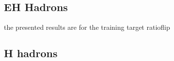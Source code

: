 \subsection{EH Hadrons}
the presented results are for the training target ratioflip





\subsection{H hadrons}




